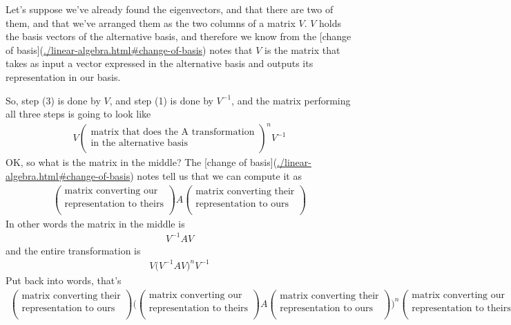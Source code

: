 Let's suppose we've already found the eigenvectors, and that there are two of
them, and that we've arranged them as the two columns of a matrix $V$. $V$ holds
the basis vectors of the alternative basis, and therefore we know from the
[change of basis](\url{./linear-algebra.html#change-of-basis}) notes that $V$ is the
matrix that takes as input a vector expressed in the alternative basis and
outputs its representation in our basis.

So, step (3) is done by $V$, and step (1) is done by $V^{-1}$, and the matrix
performing all three steps is going to look like
\begin{align*}
  V
  \begin{pmatrix}\text{matrix that does the A transformation}\\\text{in the alternative basis} \\ \end{pmatrix}^n
  V^{-1}
\end{align*}
OK, so what is the matrix in the middle? The [change of
basis](\url{./linear-algebra.html#change-of-basis}) notes tell us that we can compute it as
\begin{align*}
  \begin{pmatrix}\text{matrix converting our}\\\text{representation to theirs} \\ \end{pmatrix}
  A
  \begin{pmatrix}\text{matrix converting their}\\\text{representation to ours} \\ \end{pmatrix}
\end{align*}
In other words the matrix in the middle is
\begin{align*}
  V^{-1}AV
\end{align*}
and the entire transformation is
\begin{align*}
  V
  \Big(V^{-1}AV\Big)^n
  V^{-1}
\end{align*}
Put back into words, that's
\begin{align*}
  \begin{pmatrix}\text{matrix converting their}\\\text{representation to ours} \\ \end{pmatrix}
  \Bigg(
  \begin{pmatrix}\text{matrix converting our}\\\text{representation to theirs} \\ \end{pmatrix}
  A
  \begin{pmatrix}\text{matrix converting their}\\\text{representation to ours} \\ \end{pmatrix}
  \Bigg)^n
  \begin{pmatrix}\text{matrix converting our}\\\text{representation to theirs} \\ \end{pmatrix}
\end{align*}

